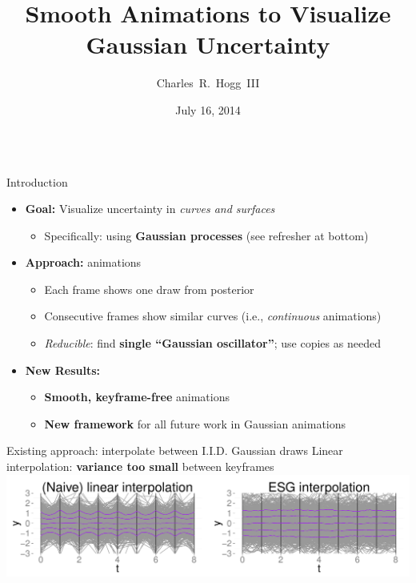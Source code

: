 \documentclass[final,t]{beamer}\usepackage[]{graphicx}\usepackage[]{color}
\title[Smooth Animations]{\huge Smooth Animations to Visualize Gaussian Uncertainty}
\author{Charles~R.~Hogg~III}
\institute[Google]{Google, Inc.}
\date{July 16, 2014}
\makeatletter
\def\maxwidth{ %
  \ifdim\Gin@nat@width>\linewidth
    \linewidth
  \else
    \Gin@nat@width
  \fi
}
\newenvironment{knitrout}{}{} %
\makeatother
\begin{document}
\setlength{\leftmargini}{1.5em}

\begin{frame}[fragile]
  \begin{columns}[T,onlytextwidth]

    \begin{column}{.325\linewidth}

      \begin{block}{Introduction}
        \begin{itemize}
          \item \textbf{Goal:} Visualize uncertainty in \textit{curves and
            surfaces}
            \begin{itemize}
              \item Specifically: using \textbf{Gaussian processes}
                (see refresher at bottom)
            \end{itemize}
          \item \textbf{Approach:} animations
            \begin{itemize}
              \item Each frame shows one draw from posterior
              \item Consecutive frames show similar curves
                (i.e., \textit{continuous} animations)
              \item \textit{Reducible}:
                find \textbf{single ``Gaussian oscillator''};
                use copies as needed
            \end{itemize}
          \item \textbf{New Results:}
            \begin{itemize}
              \item \textbf{Smooth, keyframe-free} animations
              \item \textbf{New framework} for all future work in Gaussian
                animations
            \end{itemize}
        \end{itemize}
      \end{block}

      \begin{block}{Existing approach:
        interpolate between I.I.D. Gaussian draws}
        Linear interpolation: \textbf{variance too small} between keyframes
\begin{knitrout}
\color{fgcolor}
\includegraphics[width=\maxwidth]{figure/interpolation} 


\end{knitrout}
\end{block}
\end{column}
\end{columns}
\end{frame}
\end{document}
